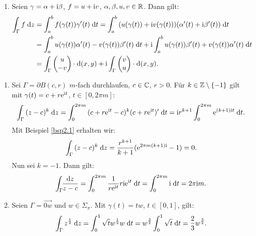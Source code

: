 \documentclass[a4paper,twoside,DIV15,BCOR12mm]{scrbook}
\begin{document}
\begin{bem}
\begin{enumerate}
\item Seien $\gamma = \alpha +\mathrm{i}\beta$, $f=u+\mathrm{i} v$, $\alpha,\beta,u,v\in\mathbb{R}$. Dann gilt:
\begin{align*}
\integral{\Gamma}{}{f}{z}&=\integral{a}{b}{f(\gamma(t))\gamma^\prime(t)}{t} = \integral{a}{b}{(u(\gamma(t))+\i v(\gamma(t)))(\alpha^\prime(t)+\i\beta^\prime(t))}{t}\\
&=\integral{a}{b}{u(\gamma(t))\alpha^\prime(t)-v(\gamma(t))\beta^\prime(t)}{t} + \i\integral{a}{b}{u(\gamma(t))\beta^\prime(t)+v(\gamma(t))\alpha^\prime(t)}{t}\\
&=\integral{\Gamma}{}{\cmplx{u}{-v}\cdot}{(x,y)}+\i\integral{\Gamma}{}{\cmplx{v}{u}\cdot}{(x,y)}.
\end{align*}
\end{enumerate}
\end{bem}

\begin{bsp}\label{bsp2.6}\begin{enumerate}
\item Sei $\Gamma = \partial B(c,r)$ $m$-fach durchlaufen, $c\in\mathbb{C}$, $r>0$. Für $k\in\mathbb{Z}\setminus\{-1\}$ gilt mit $\gamma(t) = c + r\mathrm{e}^{\mathrm{i} t}$, $t\in[0,2\pi m]$:
\[\int_{\Gamma}^{}{(z-c)^k}\;\mathrm{d} z = \int_{0}^{2\pi m}{(c+r\mathrm{e}^{\mathrm{i} t}-c)^k(c+r\mathrm{e}^{\mathrm{i} t})^\prime}\;\mathrm{d} t=\mathrm{i} r^{k+1}\int_{0}^{2\pi m}{\mathrm{e}^{(k+1)\mathrm{i} t}}\;\mathrm{d} t.\]
Mit Beispiel \ref{bsp2.1} erhalten wir:
\[\int_{\Gamma}^{}{(z-c)^k}\;\mathrm{d} z = \frac{r^{k+1}}{k+1}(\mathrm{e}^{2\pi m(k+1)\mathrm{i}}-1) = 0.\]
Nun sei $k=-1$. Dann gilt:
\[\int_\Gamma\!\!\frac{\mathrm{d} z}{z-c}=\int_{0}^{2\pi m}{\frac{1}{r\mathrm{e}^{\mathrm{i} t}}r\mathrm{i}\mathrm{e}^{\mathrm{i} t}}\;\mathrm{d} t=\int_{0}^{2\pi m}{\mathrm{i}}\;\mathrm{d} t = 2\pi\mathrm{i} m.\]

\item Seien $\Gamma = \overrightarrow{0w}$ und $w\in\Sigma_\pi$. Mit $\gamma(t)=tw$, $t\in[0,1]$, gilt:
\[\int_{\Gamma}^{}{z^\frac{1}{2}}\;\mathrm{d} z = \int_{0}^{1}{\sqrt{t}w^\frac{1}{2}w}\;\mathrm{d} t = w^\frac{3}{2}\int_{0}^{1}{\sqrt{t}}\;\mathrm{d} t = \frac{2}{3}w^\frac{3}{2}.\]
\end{enumerate}
\end{bsp}
\end{document}
